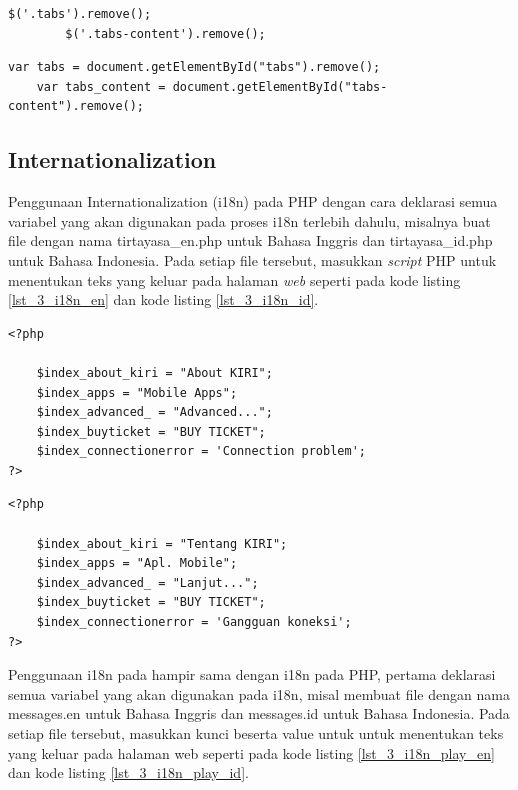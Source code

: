 \begin{lstlisting}[caption=Mendapatkan elemen View pada JavaScript PHP,label = {lst_3_elem_PHP}]
		$('.tabs').remove();
		$('.tabs-content').remove();
\end{lstlisting}

\begin{lstlisting}[caption=Mendapatkan elemen View pada JavaScript \play,label = {lst_3_elem_play}]
    var tabs = document.getElementById("tabs").remove();
    var tabs_content = document.getElementById("tabs-content").remove();
\end{lstlisting}

\subsection{Internationalization}
Penggunaan Internationalization (i18n) pada PHP dengan cara deklarasi semua variabel yang akan digunakan pada proses i18n terlebih dahulu, misalnya buat file dengan nama tirtayasa\_en.php untuk Bahasa Inggris dan tirtayasa\_id.php untuk Bahasa Indonesia. Pada setiap file tersebut, masukkan \textit{script} PHP untuk menentukan teks yang keluar pada halaman \textit{web} seperti pada kode listing \ref{lst_3_i18n_en} dan kode listing \ref{lst_3_i18n_id}. 

\begin{lstlisting}[caption=Script PHP untuk Bahasa Inggris,label = {lst_3_i18n_en}]
<?php

	$index_about_kiri = "About KIRI";
	$index_apps = "Mobile Apps";
	$index_advanced_ = "Advanced...";
	$index_buyticket = "BUY TICKET";
	$index_connectionerror = 'Connection problem';
?>
\end{lstlisting}


\begin{lstlisting}[caption=Script PHP untuk Bahasa Indonesia,label = {lst_3_i18n_id}]
<?php

	$index_about_kiri = "Tentang KIRI";
	$index_apps = "Apl. Mobile";
	$index_advanced_ = "Lanjut...";
	$index_buyticket = "BUY TICKET";
	$index_connectionerror = 'Gangguan koneksi';
?>
\end{lstlisting}

Penggunaan i18n pada \play hampir sama dengan i18n pada PHP, pertama deklarasi semua variabel yang akan digunakan pada i18n, misal membuat file dengan nama messages.en untuk Bahasa Inggris dan messages.id untuk Bahasa Indonesia. Pada setiap file tersebut, masukkan kunci beserta value untuk untuk menentukan teks yang keluar pada halaman web seperti pada kode listing \ref{lst_3_i18n_play_en} dan kode listing \ref{lst_3_i18n_play_id}.

